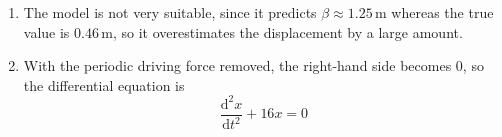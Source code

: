 \documentclass[leqno]{article}
\begin{document}
\begin{enumerate}[
  label=\textbf{\arabic*.},
  leftmargin=*,
  topsep=0pt,
  partopsep=0pt,
  parsep=0pt
]
\begin{djsSolution}
\begin{enumerate}[label=\textbf{(\alph*)}]
  First use $x(0)=0.20$:
  \[
  0.20=A\cos 0+B\sin 0-\frac{3}{8}(0)\cos 0
  \]

  so
  \[
  A=0.20
  \]

  Differentiate $x$:
  \begin{align*}
  \frac{\mathrm{d}x}{\mathrm{d}t}
  &= -4A\sin 4t+4B\cos 4t-\frac{3}{8}\cos 4t+\frac{3}{2}t\sin 4t
  \end{align*}

  Initially the glider is to the right of equilibrium, and moving towards equilibrium, so its initial velocity is negative. When $t=0$, $\frac{\mathrm{d}x}{\mathrm{d}t}=-0.50$:
  \[
  -0.50=-4A\sin 0+4B\cos 0-\frac{3}{8}\cos 0+\frac{3}{2}(0)\sin 0
  \]

  so
  \[
  -0.50=4B-\frac{3}{8}
  \]

  Hence
  \begin{align*}
  4B&=-\frac{1}{2}+\frac{3}{8} \\
     &=-\frac{1}{8}
  \end{align*}

  and therefore
  \[
  B=-\frac{1}{32}
  \]

  So the displacement is
  \[
  x=0.20\cos 4t-\frac{1}{32}\sin 4t-\frac{3}{8}t\cos 4t
  \]

  When $t=4$:
  \begin{align*}
  \beta=x(4)
  &=0.20\cos 16-\frac{1}{32}\sin 16-\frac{3}{8}(4)\cos 16 \\
  &=0.20\cos 16-\frac{1}{32}\sin 16-\frac{3}{2}\cos 16 \\
  &\approx 1.25
  \end{align*}

  Therefore
  \[
  \beta \approx 1.25\,\mathrm{m}\qquad\text{(3 s.f.)}
  \]

  \item The model is not very suitable, since it predicts $\beta\approx 1.25\,\mathrm{m}$ whereas the true value is $0.46\,\mathrm{m}$, so it overestimates the displacement by a large amount.

  \item With the periodic driving force removed, the right-hand side becomes $0$, so the differential equation is
  \[
  \frac{\mathrm{d}^2x}{\mathrm{d}t^2}+16x=0
  \]
\end{enumerate}
\end{djsSolution}


\newpage

\questionitem


\end{enumerate}
\end{document}
